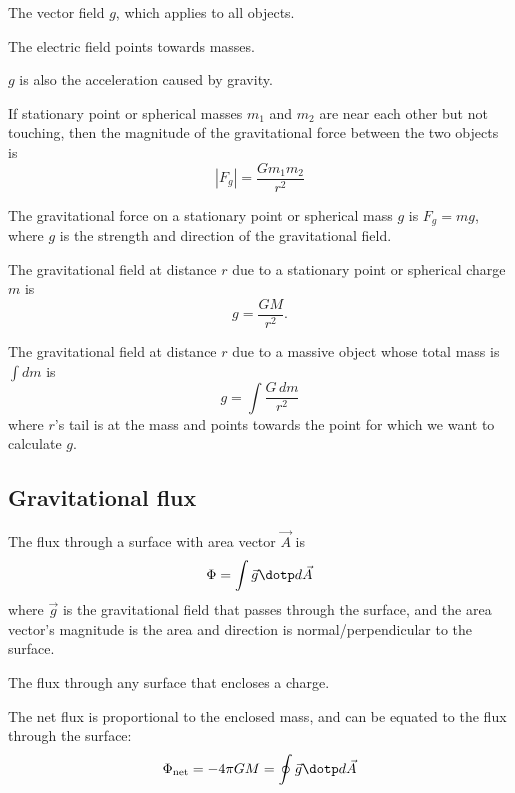 \begin{definition}
  The vector field $g$, which applies to all objects.

  The electric field points towards masses.

	$g$ is also the acceleration caused by gravity.
\end{definition}

\begin{namedlaw}
  If stationary point or spherical masses $m_1$ and $m_2$ are near each other but not touching, then the magnitude of the gravitational force between the two objects is
  \[
    |F_g| = \frac{G m_1 m_2}{r^2}
  \]
\end{namedlaw}

\begin{law}
  The gravitational force on a stationary point or spherical mass $g$ is $F_g = mg$, where $g$ is the strength and direction of the gravitational field.
\end{law}

\begin{law}
  The gravitational field at distance $r$ due to a stationary point or spherical charge $m$ is
  \[
    g = \frac{GM}{r^2}.
  \]

  The gravitational field at distance $r$ due to a massive object whose total mass is $\int dm$ is
  \[
    g = \int \frac{G \,dm}{r^2}
  \]
  where $r$'s tail is at the mass and points towards the point for which we want to calculate $g$.
\end{law}

\subsection{Gravitational flux}

\begin{definition}
  The flux through a surface with area vector $\vec{A}$ is
  \[
    \Phi = \int \vec{g} \dotp d\vec{A}
  \]
  where $\vec{g}$ is the gravitational field that passes through the surface, and the area vector's magnitude is the area and direction is normal/perpendicular to the surface.
\end{definition}

\begin{definition}
  The flux through any surface that encloses a charge.
\end{definition}

\begin{namedtheorem}
  The net flux is proportional to the enclosed mass, and can be equated to the flux through the surface:
  \[
    \Phi_{\text{net}} = - 4\pi G M = \oint \vec{g} \dotp d\vec{A}
  \]
\end{namedtheorem}
